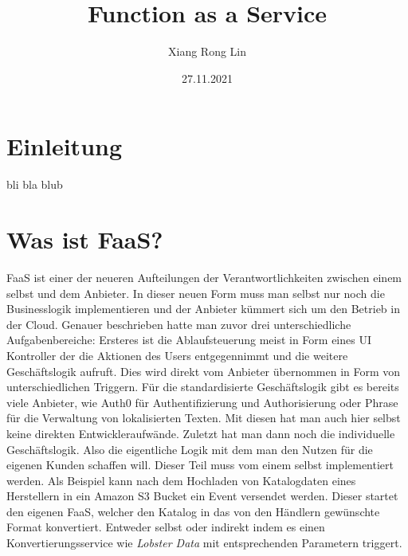 \documentclass[12pt, a4paper]{article}
\title{Function as a Service}
\author{Xiang Rong Lin}
\date{27.11.2021}
\begin{document}
\maketitle



\newpage
\tableofcontents

\newpage

\section{Einleitung}
bli bla blub

\section{Was ist \ac{FaaS}?}
\ac{FaaS} ist einer der neueren Aufteilungen der Verantwortlichkeiten zwischen einem selbst und dem Anbieter.
In dieser neuen Form muss man selbst nur noch die Businesslogik implementieren und der Anbieter kümmert sich um den Betrieb in der Cloud.
Genauer beschrieben hatte man zuvor drei unterschiedliche Aufgabenbereiche\cite{serverless2017roewekamp}:
Ersteres ist die Ablaufsteuerung meist in Form eines UI Kontroller der die Aktionen des Users entgegennimmt und die weitere Geschäftslogik aufruft.
Dies wird direkt vom Anbieter übernommen in Form von unterschiedlichen Triggern.
Für die standardisierte Geschäftslogik gibt es bereits viele Anbieter, wie Auth0 für Authentifizierung und Authorisierung oder Phrase für die Verwaltung von lokalisierten Texten.
Mit diesen hat man auch hier selbst keine direkten Entwickleraufwände.
\newline
Zuletzt hat man dann noch die individuelle Geschäftslogik.
Also die eigentliche Logik mit dem man den Nutzen für die eigenen Kunden schaffen will.
Dieser Teil muss vom einem selbst implementiert werden.
Als Beispiel kann nach dem Hochladen von Katalogdaten eines Herstellern in ein Amazon S3 Bucket ein Event versendet werden.
Dieser startet den eigenen \ac{FaaS}, welcher den Katalog in das von den Händlern gewünschte Format konvertiert.
Entweder selbst oder indirekt indem es einen Konvertierungsservice wie \emph{Lobster Data} mit entsprechenden Parametern triggert.
\newline
\end{document}
